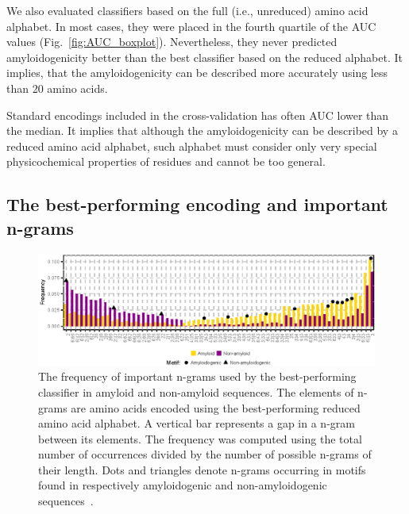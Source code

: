 \documentclass[fleqn,10pt,twoside]{gcb15submission}
\begin{document}
  We also evaluated classifiers based on the full (i.e., unreduced) amino acid 
alphabet. In most cases, they were placed in the fourth quartile of the AUC 
values (Fig.~\ref{fig:AUC_boxplot}). Nevertheless, they never predicted 
amyloidogenicity better than the best classifier based on the reduced alphabet. 
It implies, that the amyloidogenicity can be described more accurately using less 
than 20 amino acids.

  Standard encodings included in the cross-validation has often AUC lower than 
the median. It implies that although the amyloidogenicity can be described by a 
reduced amino acid alphabet, such alphabet must consider only very special 
physicochemical properties of residues and cannot be too general.

\subsection{The best-performing encoding and important n-grams}


\begin{figure}[h]
\centerline{\includegraphics{figures/ngrams.eps}}
\caption{The frequency of important n-grams used by the best-performing 
classifier in amyloid and non-amyloid sequences. The elements of n-grams are 
amino acids encoded using the best-performing reduced amino acid alphabet. A 
vertical bar represents a gap in a n-gram between its elements. The frequency 
was computed using the total number of occurrences divided by the number of 
possible n-grams of their length. Dots and triangles denote n-grams occurring in 
motifs found in respectively amyloidogenic and non-amyloidogenic 
sequences~\citep{lopez_de_la_paz_sequence_2004}.}\label{fig:ngrams} 
\end{figure}
%
%
%
\end{document}
